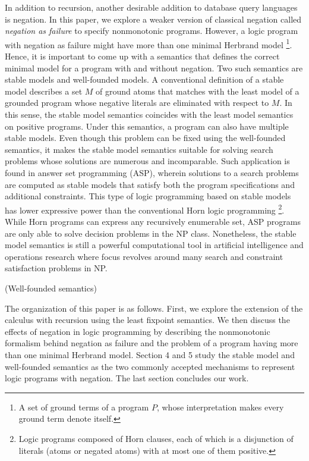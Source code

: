 In addition to recursion, another desirable addition to database query languages 
is negation. In this paper, we explore a weaker version of classical negation called 
\emph{negation as failure} to specify nonmonotonic programs. However, a logic 
program with negation as failure might have more than one minimal Herbrand model 
\footnote{A set of ground terms of a program $P$, whose interpretation 
makes every ground term denote itself.}. Hence, it is important 
to come up with a semantics that defines the correct minimal 
model for a program with and without negation. Two such semantics 
are stable models and well-founded models. A conventional 
definition of a stable model
describes a set $M$ of ground atoms that matches with the least model 
of a grounded program whose negative literals are eliminated with respect to 
$M$. In this sense, the stable model semantics coincides with 
the least model semantics on positive programs. Under this 
semantics, a program can also have multiple stable models. Even though 
this problem can be fixed using the well-founded semantics, 
it makes the stable model semantics suitable for solving search 
problems whose solutions are numerous and incomparable. Such 
application is found in answer set programming (ASP), wherein 
solutions to a search problems are computed as stable models 
that satisfy both the program specifications and additional constraints. 
This type of logic programming based on stable models has lower 
expressive power than the conventional Horn logic programming 
\footnote{Logic programs composed of Horn clauses, 
each of which is a disjunction of literals (atoms or negated atoms) with at most one of 
them positive.}. While Horn programs can express any recursively enumerable set, 
ASP programs are only able to solve decision problems in the NP class. 
Nonetheless, the stable model semantics is still 
a powerful computational tool in artificial 
intelligence and operations research where focus 
revolves around many search and constraint satisfaction 
problems in NP.

(Well-founded semantics)

The organization of this paper is as follows. First, we 
explore the extension of the calculus with recursion 
using the least fixpoint semantics. We then discuss the effects 
of negation in logic programming by describing the nonmonotonic 
formalism behind negation as failure and the problem of 
a program having more than one minimal Herbrand model. Section 4 and 5 
study the stable model and well-founded semantics as the two 
commonly accepted mechanisms to represent logic programs with 
negation. The last section concludes our work.